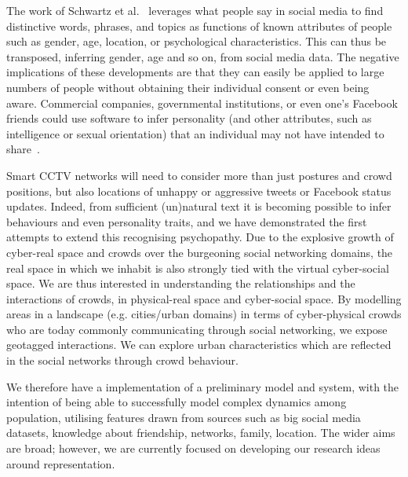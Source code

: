 \documentclass[conference]{IEEEtran}
\begin{document}
The work of Schwartz et al.~\cite{schwartz-et-al:2013}
leverages what people say in social media to find distinctive words,
phrases, and topics as functions of known attributes of people such as
gender, age, location, or psychological characteristics. This can thus
be transposed, inferring gender, age and so on, from social media
data. The negative implications of these developments are that they
can easily be applied to large numbers of people without obtaining
their individual consent or even being aware. Commercial companies,
governmental institutions, or even one's Facebook friends could use
software to infer personality (and other attributes, such as
intelligence or sexual orientation) that an individual may not have
intended to share~\cite{lambiotte+kosinski:2014}.

Smart CCTV networks will need to consider more than just postures and
crowd positions, but also locations of unhappy or aggressive tweets or
Facebook status updates. Indeed, from sufficient (un)natural text it
is becoming possible to infer behaviours and even personality traits,
and we have demonstrated the first attempts to extend this recognising
psychopathy. Due to the explosive growth of cyber-real space and
crowds over the burgeoning social networking domains, the real space
in which we inhabit is also strongly tied with the virtual
cyber-social space. We are thus interested in understanding the
relationships and the interactions of crowds, in physical-real space
and cyber-social space.  By modelling areas in a landscape
(e.g. cities/urban domains) in terms of cyber-physical crowds who are
today commonly communicating through social networking, we expose
geotagged interactions. We can explore urban characteristics which are
reflected in the social networks through crowd behaviour.

We therefore have a implementation of a preliminary model and system,
with the intention of being able to successfully model complex
dynamics among population, utilising features drawn from sources such
as big social media datasets, knowledge about friendship, networks,
family, location. The wider aims are broad; however, we are currently
focused on developing our research ideas around representation.
\end{document}

